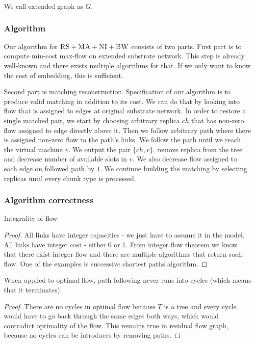 \documentclass[9pt,twocolumn]{scrartcl}
\newcommand{\CC}{\textsc{NI}}
\newcommand{\RS}{\textsc{RS}}
\newcommand{\BW}{\textsc{BW}}
\newcommand{\MA}{\textsc{MA}}
\begin{document}
We call extended graph as $G$.


\subsubsection{Algorithm}

Our algorithm for $\RS+\MA+\CC+\BW$ consists of two parts. First part is to compute min-cost max-flow on extended substrate network. This step is already well-known and there exists multiple algorithms for that. If we only want to know the cost of embedding, this is sufficient.

Second part is matching reconstruction. Specification of our algorithm is to produce valid matching in addition to its cost. We can do that by looking into flow that is assigned to edges at original substrate network. In order to restore a single matched pair, we start by choosing arbitrary replica $ch$ that has non-zero flow assigned to edge directly above it. Then we follow arbitrary path where there is assigned non-zero flow to the path's links. We follow the path until we reach the virtual machine $v$. We output the pair $\lbrace ch, v \rbrace$, remove replica from the tree and decrease number of available slots in $v$. We also decrease flow assigned to each edge on followed path by $1$. We continue building the matching by selecting replicas until every chunk type is processed.

\subsubsection{Algorithm correctness}


\begin{lemma}Integrality of flow
\end{lemma}
\begin{proof}
  All links have integer capacities - we just have to assume it in the model. All links have integer cost - either 0 or 1. From integer flow theorem we know that there exist integer flow and there are multiple algorithms that return such flow. One of the examples is successive shortest paths algorithm.
\end{proof}


\begin{lemma}When applied to optimal flow, path following never runs into cycles (which means that it terminates).
\end{lemma}
\begin{proof}
There are no cycles in optimal flow because $T$ is a tree and every cycle would have to go back through the same edges both ways, which would contradict optimality of the flow. This remains true in residual flow graph, because no cycles can be introduces by removing paths.
\end{proof}
\end{document}
